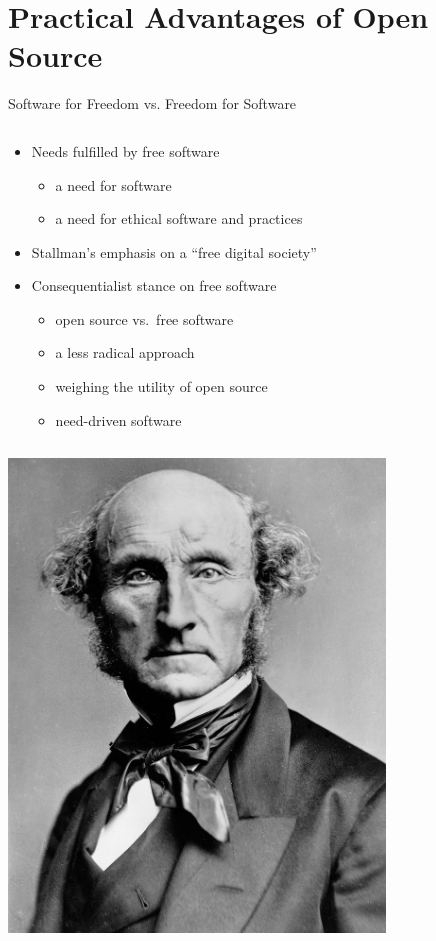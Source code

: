 \section{Practical Advantages of Open Source}\frame{\sectionpage}

\begin{frame}{Software for Freedom vs. Freedom for Software}
  \begin{column}{0.6\textwidth}
    \begin{itemize}
      \item Needs fulfilled by free software
        \begin{itemize}
          \item a need for software
          \item a need for ethical software and practices
        \end{itemize}
      \item Stallman's emphasis on a ``free digital society''
      \item Consequentialist stance on free software
        \begin{itemize}
          \item open source vs.\ free software
          \item a less radical approach
          \item weighing the utility of open source
          \item need-driven software~\cite[p. 17]{bisson}
        \end{itemize}
    \end{itemize}
  \end{column}
  \begin{column}{0.4\textwidth}\raggedleft
    \includegraphics[width = 0.75\textwidth]{mill.jpg}
  \end{column}
\end{frame}

